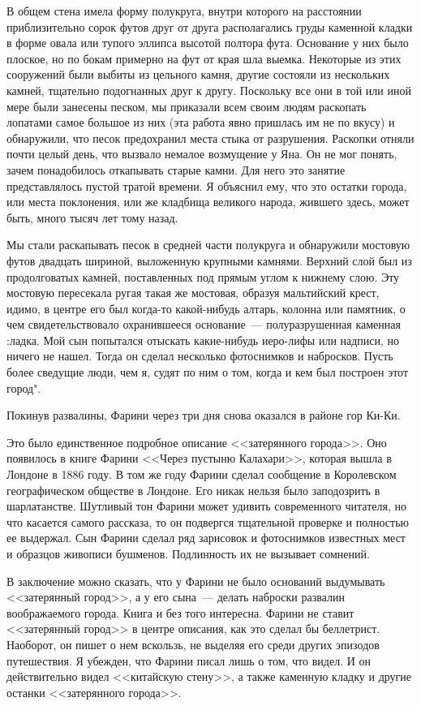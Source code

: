 \documentclass[12pt,a4paper,twoside,openany,svgnames]{memoir}
\begin{document}
В общем стена имела форму полукруга, внутри которого на расстоянии приблизительно сорок футов друг от друга располагались груды каменной кладки в форме овала или тупого эллипса высотой полтора фута. Основание у них было плоское, но по бокам примерно на фут от края шла выемка. Некоторые из этих сооружений были выбиты из цельного камня, другие состояли из нескольких камней, тщательно подогнанных друг к другу. Поскольку все они в той или иной мере были занесены песком, мы приказали всем своим людям раскопать лопатами самое большое из них (эта работа явно пришлась им не по вкусу) и обнаружили, что песок предохранил места стыка от разрушения. Раскопки отняли почти целый день, что вызвало немалое возмущение у Яна. Он не мог понять, зачем понадобилось откапывать старые камни. Для него это занятие представлялось пустой тратой времени. Я объяснил ему, что это остатки города, или места поклонения, или же кладбища великого народа, жившего здесь, может быть, много тысяч лет тому назад.

Мы стали раскапывать песок в средней части полукруга и обнаружили мостовую футов двадцать шириной, выложенную крупными камнями. Верхний слой был из продолговатых камней, поставленных под прямым углом к нижнему слою. Эту мостовую пересекала ругая такая же мостовая, образуя мальтийский крест, идимо, в центре его был когда-то какой-нибудь алтарь, колонна или памятник, о чем свидетельствовало охранившееся основание~--- полуразрушенная каменная :ладка. Мой сын попытался отыскать какие-нибудь иеро-лифы или надписи, но ничего не нашел. Тогда он сделал несколько фотоснимков и набросков. Пусть более сведущие люди, чем я, судят по ним о том, когда и кем был построен этот город".

Покинув развалины, Фарини через три дня снова оказался в районе гор Ки-Ки.

Это было единственное подробное описание <<затерянного города>>. Оно появилось в книге Фарини <<Через пустыню Калахари>>, которая вышла в Лондоне в 1886 году. В том же году Фарини сделал сообщение в Королевском географическом обществе в Лондоне. Его никак нельзя было заподозрить в шарлатанстве. Шутливый тон Фарини может удивить современного читателя, но что касается самого рассказа, то он подвергся тщательной проверке и полностью ее выдержал. Сын Фарини сделал ряд зарисовок и фотоснимков известных мест и образцов живописи бушменов. Подлинность их не вызывает сомнений.

В заключение можно сказать, что у Фарини не было оснований выдумывать <<затерянный город>>, а у его сына~--- делать наброски развалин воображаемого города. Книга и без того интересна. Фарини не ставит <<затерянный город>> в центре описания, как это сделал бы беллетрист. Наоборот, он пишет о нем вскользь, не выделяя его среди других эпизодов путешествия. Я убежден, что Фарини писал лишь о том, что видел. И он действительно видел <<китайскую стену>>, а также каменную кладку и другие останки <<затерянного города>>.
\end{document}
